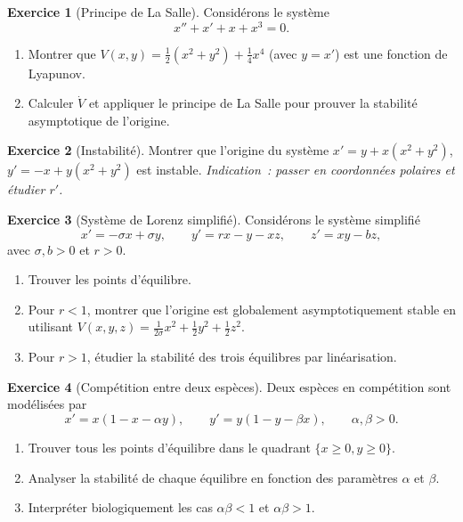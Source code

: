 \documentclass[12pt,a4paper,openany]{book}
\theoremstyle{definition}
\newtheorem{exercice}{Exercice}[chapter]
\theoremstyle{plain}
\theoremstyle{remark}
\begin{document}
\begin{exercice}[Principe de La Salle]\label{exo:lasalle}
  Considérons le système
  \[
    x''+x'+x+x^3=0.
  \]
  \begin{enumerate}[label=\alph*)]
    \item Montrer que $V(x,y)=\frac{1}{2}(x^2+y^2)+\frac{1}{4}x^4$
      (avec $y=x'$) est une fonction de Lyapunov.
    \item Calculer $\dot{V}$ et appliquer le principe de La Salle pour
      prouver la stabilité asymptotique de l'origine.
  \end{enumerate}
\end{exercice}

\begin{exercice}[Instabilité]\label{exo:instabilite}
  Montrer que l'origine du système $x'=y+x(x^2+y^2)$,
  $y'=-x+y(x^2+y^2)$ est instable. \textit{Indication~: passer en
  coordonnées polaires et étudier $r'$.}
\end{exercice}

\begin{exercice}[Système de Lorenz simplifié]\label{exo:lorenz}
  Considérons le système simplifié
  \[
    x'=-\sigma x+\sigma y,\qquad y'=rx-y-xz,\qquad z'=xy-bz,
  \]
  avec $\sigma,b>0$ et $r>0$.
  \begin{enumerate}[label=\alph*)]
    \item Trouver les points d'équilibre.
    \item Pour $r<1$, montrer que l'origine est globalement
      asymptotiquement stable en utilisant
      $V(x,y,z)=\frac{1}{2\sigma}x^2+\frac{1}{2}y^2+\frac{1}{2}z^2$.
    \item Pour $r>1$, étudier la stabilité des trois équilibres par
      linéarisation.
  \end{enumerate}
\end{exercice}

\begin{exercice}[Compétition entre deux espèces]\label{exo:competition}
  Deux espèces en compétition sont modélisées par
  \[
    x'=x(1-x-\alpha y),\qquad y'=y(1-y-\beta x),
    \qquad \alpha,\beta>0.
  \]
  \begin{enumerate}[label=\alph*)]
    \item Trouver tous les points d'équilibre dans le quadrant
      $\{x\geq 0,y\geq 0\}$.
    \item Analyser la stabilité de chaque équilibre en fonction des
      paramètres $\alpha$ et $\beta$.
    \item Interpréter biologiquement les cas $\alpha\beta<1$ et
      $\alpha\beta>1$.
  \end{enumerate}
\end{exercice}
\end{document}
